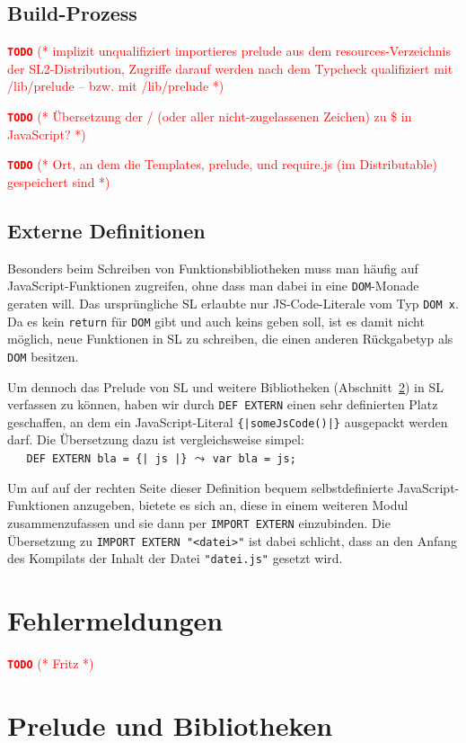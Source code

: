 \documentclass[runningheads]{llncs}
\newcommand{\TODO}[1]{ \textcolor{red}{\textbf{\texttt{\large{TODO}}} (* #1 *)}\par}
\begin{document}
\subsection{Build-Prozess}
\label{sec:compBuild}

\TODO{implizit unqualifiziert importieres prelude aus dem
resources-Verzeichnis der SL2-Distribution, Zugriffe darauf werden
nach dem Typcheck qualifiziert mit /lib/prelude -- bzw. mit /lib/prelude}

\TODO{Übersetzung der / (oder aller nicht-zugelassenen Zeichen) zu \$
in JavaScript?}

\TODO{Ort, an dem die Templates, prelude, und require.js (im Distributable)
gespeichert sind}

\subsection{Externe Definitionen}
Besonders beim Schreiben von Funktionsbibliotheken muss man häufig auf
Java\-Script-Funktionen zugreifen, ohne dass man dabei in eine
\verb|DOM|-Monade geraten will. Das ursprüngliche SL erlaubte nur
JS-Code-Literale vom Typ \verb|DOM x|. Da es kein \verb|return| für
\verb|DOM| gibt und auch keins geben soll, ist es damit nicht möglich,
neue Funktionen in SL zu schreiben, die einen anderen Rückgabetyp als
\verb|DOM| besitzen.

Um dennoch das Prelude von SL und weitere Bibliotheken (Abschnitt~\ref{sec:libs})
in SL verfassen zu können, haben wir durch \verb|DEF EXTERN| einen sehr
definierten Platz geschaffen, an dem ein Java\-Script-Literal
\verb.{|someJsCode()|}. ausgepackt werden darf. Die Übersetzung dazu ist
vergleichsweise simpel:\\
\verb.   DEF EXTERN bla = {| js |}.
\quad $\leadsto$ \quad \verb|var bla = js;|

Um auf auf der rechten Seite dieser Definition bequem selbstdefinierte
Java\-Script-Funktionen anzugeben, bietete es sich an, diese in einem
weiteren Modul zusammenzufassen und sie dann per \verb|IMPORT EXTERN|
einzubinden. Die Übersetzung zu \verb|IMPORT EXTERN "<datei>"| ist dabei
schlicht, dass an den Anfang des Kompilats der Inhalt der Datei
\verb|"datei.js"| gesetzt wird.

\section{Fehlermeldungen}
\label{sec:errors}
\TODO{Fritz}

\section{Prelude und Bibliotheken}
\label{sec:libs}
\end{document}

